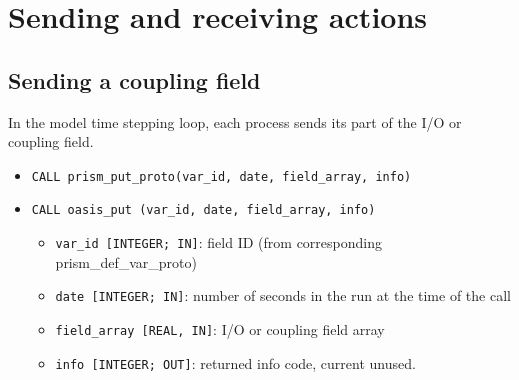 
\section{Sending and receiving actions}
\label{subsubsec_sendingreceiving}

\subsection{Sending a coupling field}
\label{prismput}

In the model time stepping loop, each process 
sends its part of the I/O or coupling field. 

\begin{itemize} 
 
\item {\tt CALL prism\_put\_proto(var\_id, date, field\_array, info)}
\item {\tt CALL oasis\_put       (var\_id, date, field\_array, info)}
\begin{itemize}
\item {\tt var\_id [INTEGER; IN]}: field ID (from
  corresponding prism\_def\_var\_proto)
\item {\tt date [INTEGER; IN]}: number of seconds in the run at the
time of the call
\item {\tt field\_array [REAL, IN]}: I/O or coupling field array 
\item {\tt info [INTEGER; OUT]}: returned info code, current unused.
\end{itemize}
\end{itemize}

